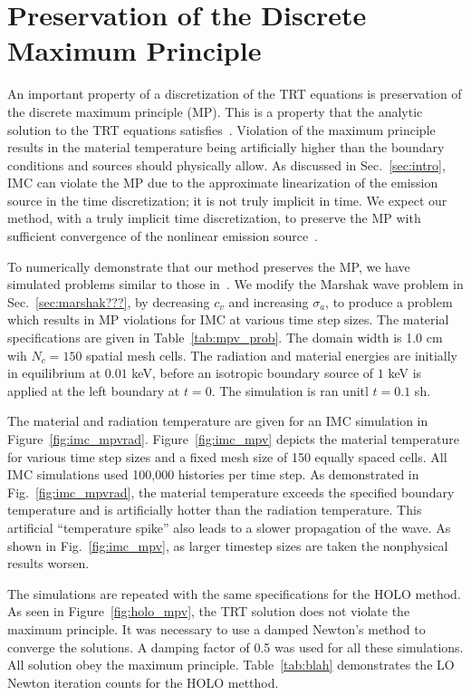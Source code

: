 
\section{Preservation of the Discrete Maximum Principle}

An important property of a discretization of the TRT equations is preservation of the
discrete maximum principle (MP).  This is a property that the analytic solution to the
TRT equations satisfies~\cite{larsen_mpv}.
Violation of the maximum principle results in
the material temperature being artificially higher than the boundary conditions and
sources should physically allow. As discussed in Sec.~\ref{sec:intro}, IMC can violate the MP due to the approximate
linearization of the emission source in the time discretization; it is not truly implicit in time. 
We expect our
method, with a truly implicit time discretization, to preserve the MP with sufficient
convergence of the nonlinear emission source~\cite{larsen_mpv}.

To numerically demonstrate that our method preserves the MP, we have simulated problems
similar to those in~\cite{wollaber2013discrete}.  We modify the Marshak wave problem in
Sec.~\ref{sec:marshak???}, by decreasing $c_v$ and increasing $\sigma_a$, to produce a
problem which results in MP violations for IMC at various time step sizes.  The material
specifications are given in Table~\ref{tab:mpv_prob}. The domain width is 1.0 cm wih
$N_c=150$ spatial mesh cells.  The radiation and material energies are initially in
equilibrium at $0.01$ keV, before an isotropic boundary source of $1$ keV is applied at
the left boundary at $t=0$. The simulation is ran unitl $t=0.1$ sh. 

The material and radiation temperature are given for an IMC simulation in
Figure~\ref{fig:imc_mpvrad}.  Figure~\ref{fig:imc_mpv} depicts the material temperature
for various time step sizes and a fixed mesh size of 150 equally spaced cells. All IMC
simulations used 100,000 histories per time step. As demonstrated in
Fig.~\ref{fig:imc_mpvrad}, the material temperature exceeds the specified boundary
temperature and is artificially hotter than the radiation temperature.  This artificial
``temperature spike'' also leads to a slower propagation of the wave.  As shown in
Fig.~\ref{fig:imc_mpv}, as larger timestep sizes are taken the nonphysical results worsen.

The simulations are repeated with the same specifications for the HOLO method. As seen in
Figure~\ref{fig:holo_mpv}, the TRT solution does not violate the maximum principle. It was
necessary to use a damped Newton's method to converge the solutions.  A damping factor of
0.5 was used for all these simulations.  All solution obey the maximum principle.
Table~\ref{tab:blah} demonstrates the LO Newton iteration counts for the HOLO metthod.





